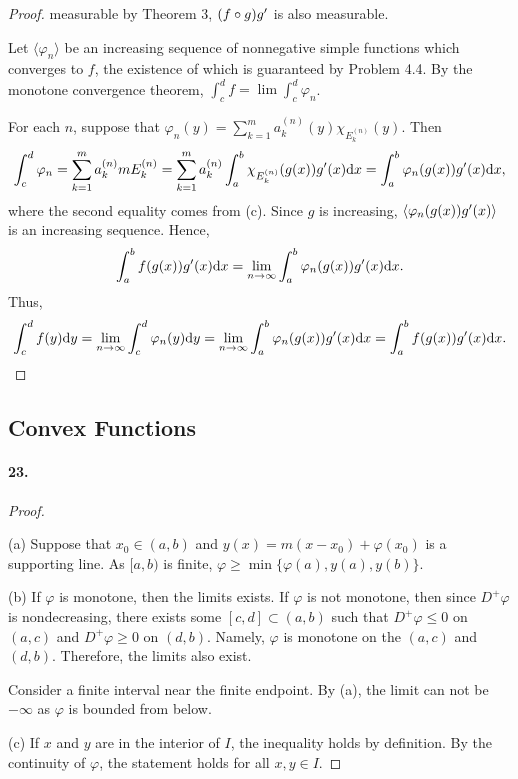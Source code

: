 \begin{proof}
    measurable by Theorem 3, $(f\circ g)g^\prime$ is also measurable. \par
    Let $\langle\varphi_n\rangle$ be an increasing sequence of nonnegative
    simple functions which converges to $f$, the existence of which is 
    guaranteed by Problem 4.4. By the monotone convergence theorem, $\int_c^d f
    =\lim\int_c^d\varphi_n$.\par
    For each $n$, suppose that $\varphi_n(y)=\sum_{k=1}^ma_k^{(n)}(y)
    \chi_{E_k^{(n)}}(y)$. Then
    \[
      \int_c^d\varphi_n = \sum_{k=1}^ma_k^{(n)}mE_{k}^{(n)}=
      \sum_{k=1}^ma_k^{(n)}\int_a^b\chi_{E_k^{(n)}}(g(x))g^\prime(x)\mathrm{d} x=
      \int_a^b\varphi_n(g(x))g^\prime(x)\mathrm{d} x,
    \]
    where the second equality comes from (c). Since $g$ is increasing, 
    $\langle\varphi_n(g(x))g^\prime(x)\rangle$ is an increasing sequence. Hence,
    \[
      \int_a^b f(g(x))g^\prime(x)\mathrm{d} x =
      \lim_{n\to\infty}\int_a^b\varphi_n(g(x))g^\prime(x)\mathrm{d} x.
    \]
    Thus,
    \[
      \int_c^d f(y)\mathrm{d} y = 
      \lim_{n\to\infty}\int_c^d\varphi_n(y)\mathrm{d} y =
      \lim_{n\to\infty}\int_a^b\varphi_n(g(x))g^\prime(x)\mathrm{d} x =
      \int_a^b f(g(x))g^\prime(x)\mathrm{d} x.
    \]
  \end{proof}


\subsection{Convex Functions}
  \paragraph{23.}
  \begin{proof}
    $\,$\par
    (a) Suppose that $x_0\in(a,b)$ and $y(x)=m(x-x_0)+\varphi(x_0)$ is a 
    supporting line. As $[a,b)$ is finite, $\varphi\ge\min\{\varphi(a),y(a), 
    y(b)\}$. \par
    (b) If $\varphi$ is monotone, then the limits exists. If $\varphi$ is not
    monotone, then since $D^+\varphi$ is nondecreasing, there exists some $[c,d]
    \subset(a,b)$ such that $D^+\varphi\le 0$ on $(a,c)$ and $D^+\varphi\ge 0$
    on $(d,b)$. Namely, $\varphi$ is monotone on the $(a,c)$ and $(d,b)$.
    Therefore, the limits also exist.\par
    Consider a finite interval near the finite endpoint. By (a), the limit can
    not be $-\infty$ as $\varphi$ is bounded from below.\par
    (c) If $x$ and $y$ are in the interior of $I$, the inequality holds by 
    definition. By the continuity of $\varphi$, the statement holds for all $x,y
    \in I$.
  \end{proof}

